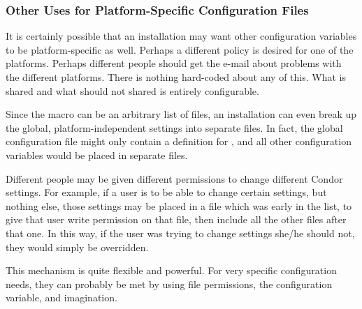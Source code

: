 \subsubsection{\label{sec:Other-Uses-for-Platform-Files}Other Uses for
Platform-Specific Configuration Files} 

It is certainly possible that an installation may want other 
configuration variables to be platform-specific as well.
Perhaps a different policy is desired for
one of the platforms.
Perhaps different people should get the
e-mail about problems with the different platforms.
There is nothing hard-coded about any of this.
What is shared and
what should not shared is entirely configurable.

Since the  macro can be an arbitrary
list of files, an installation can even break up the global,
platform-independent settings into separate files.
In fact, the global configuration file might
only contain a definition for , and all
other configuration variables would be placed in separate files.  

Different people may be given different permissions to change different
Condor settings.  For example, if a user is to be able to
change certain settings, but nothing else, those
settings may be placed in a file which was early
in the  list,
to give that user write permission on that file, then include all
the other files after that one.  In this way, if the user was trying to
change settings she/he should not, they would simply be overridden.  

This mechanism is quite flexible and powerful.  For
very specific configuration needs, they can probably be met by
using file permissions, the  configuration
variable, and imagination.

